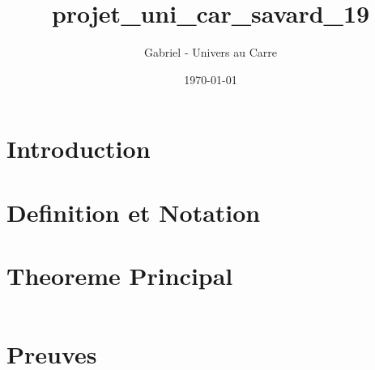 \documentclass[12pt]{article}
\title{projet_uni_car_savard_19}
\author{Gabriel - Univers au Carre}
\date{\today}
\begin{document}
\maketitle


\section{Introduction}



\section{Definition et Notation}



\section{Theoreme Principal}


\begin{equation}
\end{equation}


\section{Preuves}


\end{document}
